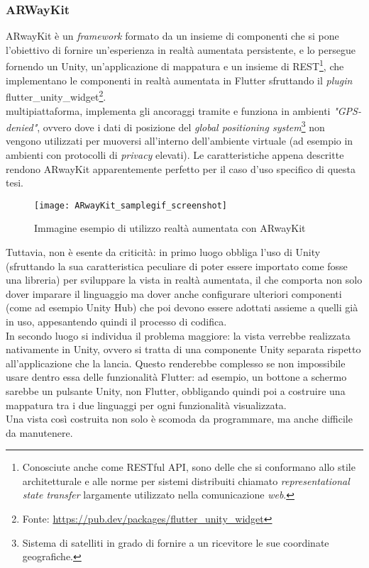 \subsubsection{ARWayKit}
ARwayKit è un \textit{framework} formato da un insieme di componenti che si pone l'obiettivo di fornire un'esperienza in realtà aumentata persistente, e lo persegue fornendo un \sdk{} Unity, un'applicazione di mappatura e un insieme di \api{} REST\footnote{Conosciute anche come RESTful API, sono delle \api{} che si conformano allo stile architetturale e alle norme per sistemi distribuiti chiamato \textit{representational state transfer} largamente utilizzato nella comunicazione \textit{web}.}, che implementano le componenti in realtà aumentata in Flutter sfruttando il \textit{plugin} flutter\_unity\_widget\footnote{Fonte: \url{https://pub.dev/packages/flutter_unity_widget}}.\\
\e{} multipiattaforma, implementa gli ancoraggi tramite \asa{} e funziona in ambienti \textit{"GPS-denied"}, ovvero dove i dati di posizione del \textit{global positioning system}\footnote{Sistema di satelliti in grado di fornire a un ricevitore le sue coordinate geografiche.} non vengono utilizzati per muoversi all'interno dell'ambiente virtuale (ad esempio in ambienti con protocolli di \textit{privacy} elevati). Le caratteristiche appena descritte rendono ARwayKit apparentemente perfetto per il caso d'uso specifico di questa tesi. 

\begin{figure}[H]
  \centering
  \texttt{[image: ARwayKit\_samplegif\_screenshot]}
  \caption[Realtà aumentata con ARwayKit]{Immagine esempio di utilizzo realtà aumentata con ARwayKit\footnotemark}
\end{figure}

Tuttavia, non è esente da criticità: in primo luogo obbliga l'uso di Unity (sfruttando la sua caratteristica peculiare di poter essere importato come fosse una libreria) per sviluppare la vista in realtà aumentata, il che comporta non solo dover imparare il linguaggio ma dover anche configurare ulteriori componenti (come ad esempio Unity Hub) che poi devono essere adottati assieme a quelli già in uso, appesantendo quindi il processo di codifica.\\
In secondo luogo si individua il problema maggiore: la vista verrebbe realizzata nativamente in Unity, ovvero si tratta di una componente Unity separata rispetto all'applicazione che la lancia.
Questo renderebbe complesso se non impossibile usare dentro essa delle funzionalità Flutter: ad esempio, un bottone a schermo sarebbe un pulsante Unity, non Flutter, obbligando quindi poi a costruire una mappatura tra i due linguaggi per ogni funzionalità visualizzata.\\ 
Una vista così costruita non solo è scomoda da programmare, ma anche difficile da manutenere.

